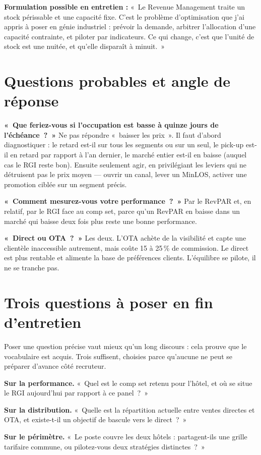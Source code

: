 \documentclass[11pt,a4paper]{article}
\newcommand{\terme}[1]{\textcolor{bleusof}{\textbf{#1}}}
\begin{document}
\begin{tcolorbox}[colback=orsof!10,colframe=orsof,boxrule=0.7pt,arc=2pt,left=6pt,right=6pt,top=5pt,bottom=5pt]
\textbf{Formulation possible en entretien :} «~Le Revenue Management traite un stock périssable et une capacité fixe. C'est le problème d'optimisation que j'ai appris à poser en génie industriel : prévoir la demande, arbitrer l'allocation d'une capacité contrainte, et piloter par indicateurs. Ce qui change, c'est que l'unité de stock est une nuitée, et qu'elle disparaît à minuit.~»
\end{tcolorbox}

\section{Questions probables et angle de réponse}

\textbf{«~Que feriez-vous si l'occupation est basse à quinze jours de l'échéance~?~»} Ne pas répondre «~baisser les prix~». Il faut d'abord diagnostiquer : le retard est-il sur tous les segments ou sur un seul, le pick-up est-il en retard par rapport à l'an dernier, le marché entier est-il en baisse (auquel cas le RGI reste bon). Ensuite seulement agir, en privilégiant les leviers qui ne détruisent pas le prix moyen --- ouvrir un canal, lever un MinLOS, activer une promotion ciblée sur un segment précis.

\textbf{«~Comment mesurez-vous votre performance~?~»} Par le RevPAR et, en relatif, par le RGI face au comp set, parce qu'un RevPAR en baisse dans un marché qui baisse deux fois plus reste une bonne performance.

\textbf{«~Direct ou OTA~?~»} Les deux. L'OTA achète de la visibilité et capte une clientèle inaccessible autrement, mais coûte 15 à 25\,\% de commission. Le direct est plus rentable et alimente la base de préférences clients. L'équilibre se pilote, il ne se tranche pas.

\section{Trois questions à poser en fin d'entretien}

Poser une question précise vaut mieux qu'un long discours : cela prouve que le vocabulaire est acquis. Trois suffisent, choisies parce qu'aucune ne peut se préparer d'avance côté recruteur.

\begin{tcolorbox}[colback=grisdoux,colframe=bleusof,boxrule=0.7pt,arc=2pt,left=6pt,right=6pt,top=5pt,bottom=5pt]
\terme{Sur la performance.} «~Quel est le comp set retenu pour l'hôtel, et où se situe le RGI aujourd'hui par rapport à ce panel~?~»

\terme{Sur la distribution.} «~Quelle est la répartition actuelle entre ventes directes et OTA, et existe-t-il un objectif de bascule vers le direct~?~»

\terme{Sur le périmètre.} «~Le poste couvre les deux hôtels : partagent-ils une grille tarifaire commune, ou pilotez-vous deux stratégies distinctes~?~»
\end{tcolorbox}
\end{document}
